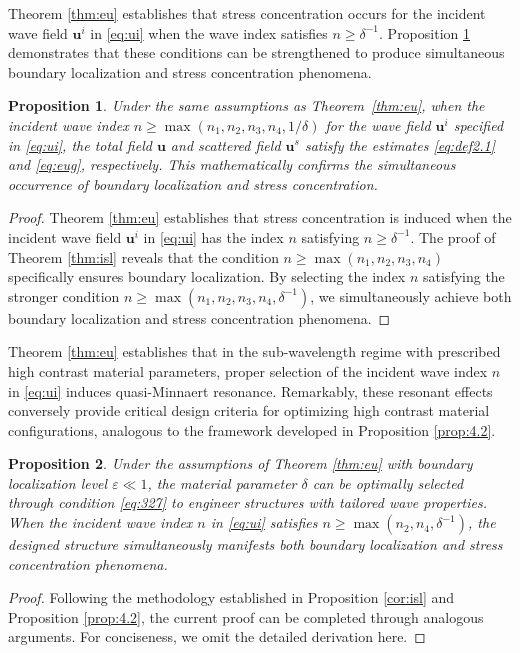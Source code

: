 \documentclass[11pt,reqno,twoside]{amsart}
\newtheorem{prop}{Proposition}[section]
\theoremstyle{definition}
\theoremstyle{remark}
\numberwithin{equation}{section}
\begin{document}
			Theorem \ref{thm:eu} establishes that stress concentration occurs for the incident wave field $\mathbf{u}^i$ in \eqref{eq:ui} when the wave index satisfies $n \geq \delta^{-1}$. Proposition \ref{prop:4.3} demonstrates that these conditions can be strengthened to produce simultaneous boundary localization and stress concentration phenomena.
			\begin{prop}\label{prop:4.3}
				Under the same assumptions as Theorem~\ref{thm:eu}, when the incident wave index $n \geq \max\left(n_1, n_2, n_3, n_4, 1/\delta\right)$ for the wave field $\mathbf{u}^i$ specified in \eqref{eq:ui}, the  total field $\mathbf{u}$ and scattered field $\mathbf{u}^s$ satisfy the estimates \eqref{eq:def2.1} and \eqref{eq:eug}, respectively. This mathematically confirms the simultaneous occurrence of boundary localization and stress concentration.
			\end{prop}
			\begin{proof}
				Theorem \ref{thm:eu} establishes that stress concentration is induced when the incident wave field $\mathbf{u}^i$ in \eqref{eq:ui} has the index $n$ satisfying $n \geq \delta^{-1}$. The proof of Theorem \ref{thm:isl} reveals that the  condition $n \geq \max\left(n_1,n_2,n_3,n_4\right)$ specifically ensures boundary localization. By selecting the index $n$ satisfying the stronger condition $n \geq\max\left(n_1,n_2,n_3,n_4,\delta^{-1}\right)$, we simultaneously achieve both boundary localization and stress concentration phenomena.
			\end{proof}
			
			Theorem \ref{thm:eu} establishes that in the sub-wavelength regime with prescribed high contrast material parameters, proper selection of the incident wave index $n$ in \eqref{eq:ui} induces quasi-Minnaert resonance. Remarkably, these resonant effects conversely provide critical design criteria for optimizing high contrast material configurations, analogous to the framework developed in Proposition \ref{prop:4.2}.
			\begin{prop}
				Under the assumptions of Theorem \ref{thm:eu} with boundary localization level $\varepsilon \ll 1$, the material parameter $\delta$ can be optimally selected through condition \eqref{eq:327} to engineer structures with tailored wave properties. When the incident wave index $n$ in \eqref{eq:ui} satisfies $n \geq \max\left(n_2,n_4,\delta^{-1}\right)$, the designed structure simultaneously manifests both boundary localization and stress concentration phenomena.
			\end{prop}
			\begin{proof}
				Following the methodology established in  Proposition \ref{cor:isl} and Proposition \ref{prop:4.2}, the current proof can be completed through analogous arguments. For conciseness, we omit the detailed derivation here.
			\end{proof}
		
\end{document}
